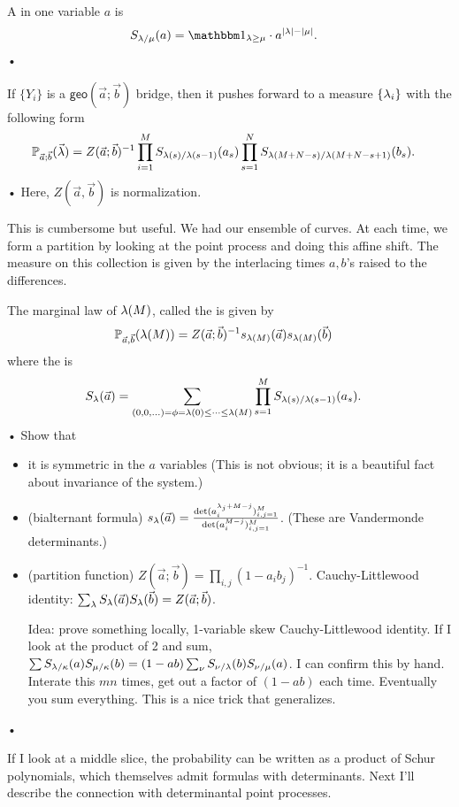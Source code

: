 A  in one variable $a$ is
\begin{align*}
S_{\la/\mu}(a) &= \one_{\la\ge \mu} \cdot a^{|\la|-|\mu|}.
\end{align*}•
\begin{exr}
If $\{Y_i\}$ is a $\mathsf{geo}(\vec a;\vec b)$ bridge, then it pushes forward to a measure $\{\lambda_i\}$ with the following form
\begin{align*}
\mathbb{P}_{\vec a; \vec b}(\vec {\lambda}) &= Z(\vec a;\vec b)^{-1} \prod_{i=1}^{M} S_{\lambda(s)/\lambda(s-1)} (a_s) \prod_{s=1}^{N} S_{\lambda(M+N-s)/\lambda(M+N-s+1)}(b_s).
\end{align*}•
Here, $Z(\vec a, \vec b)$ is normalization.
\end{exr}
This is cumbersome but useful. We had our ensemble of curves. At each time, we form a partition by looking at the point process and doing this affine shift. The measure on this collection is given by the interlacing times $a,b$'s raised to the differences.
\begin{exr}
The marginal law of $\lambda(M)$, called the  is given by 
\begin{align*}\mathbb{P}_{\vec a, \vec b}(\lambda(M)) &= Z(\vec a; \vec b)^{-1} s_{\lambda(M)}(\vec a) s_{\lambda(M)}(\vec b)
\end{align*}
where the  is
\begin{align*}
S_\lambda(\vec a) &= \sum_{(0,0,\ldots)=\phi =\lambda(0)\le \cdots \le \lambda(M)}\prod_{s=1}^{M} S_{\lambda(s)/\lambda(s-1)} (a_s).
\end{align*}•
Show that 
\begin{itemize}
\item
it is symmetric in the $a$ variables
(This is not obvious; it is a beautiful fact about invariance of the system.)
\item
(bialternant formula) $s_\lambda(\vec a) = \frac{\det(a_i^{\lambda_j+M-j})_{i,j=1}^M}{\det(a_i^{M-j})_{i,j=1}^M}$. (These are Vandermonde determinants.)
\item
(partition function) $Z(\vec a; \vec b)=\prod_{i,j} (1-a_ib_j)^{-1}$. 
Cauchy-Littlewood identity: $\sum_\lambda S_\lambda(\vec a)S_\lambda(\vec b) = Z(\vec a;\vec b)$. 

Idea: prove something locally, 1-variable skew Cauchy-Littlewood identity. If I look at the product of 2 and sum, $\sum S_{\lambda/\kappa}(a)S_{\mu/\kappa}(b) = (1-ab)\sum_\nu S_{\nu/\lambda}(b) S_{\nu/\mu}(a)$. I can confirm this by hand. Interate this $mn$ times, get out a factor of $(1-ab)$ each time. Eventually you sum everything. This is a nice trick that generalizes. %
\end{itemize}•
\end{exr}
If I look at a middle slice, the probability can be written as a product of Schur polynomials, which themselves admit formulas with determinants. Next I'll describe the connection with determinantal point processes.

